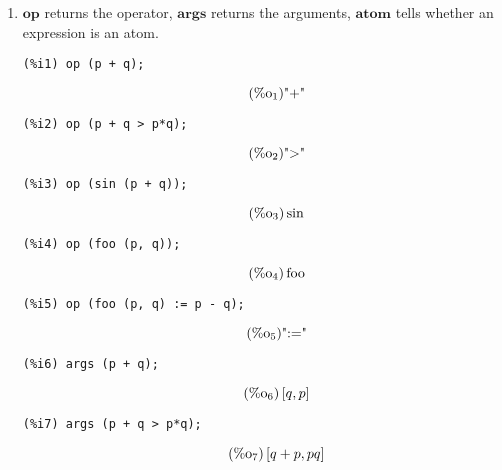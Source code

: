 \documentclass[12pt,leqno]{article}
\begin{document}
\begin{enumerate}
\item $\mathbf{op}$ returns the operator, $\mathbf{args}$ returns the arguments,
$\mathbf{atom}$ tells whether an expression is an atom.
\begin{verbatim}
(%i1) op (p + q);
\end{verbatim}
\begin{equation}
\tag{$\mathop{\mathrm{\%o}_{1}}$}\mbox{"+"}
\label{eq:doc-group1-code10-1-1}
\end{equation}
\begin{verbatim}
(%i2) op (p + q > p*q);
\end{verbatim}
\begin{equation}
\tag{$\mathop{\mathrm{\%o}_{2}}$}\mbox{"\textgreater "}
\label{eq:doc-group1-code10-2-1}
\end{equation}
\begin{verbatim}
(%i3) op (sin (p + q));
\end{verbatim}
\begin{equation}
\tag{$\mathop{\mathrm{\%o}_{3}}$}\sin
\label{eq:doc-group1-code10-3-1}
\end{equation}
\begin{verbatim}
(%i4) op (foo (p, q));
\end{verbatim}
\begin{equation}
\tag{$\mathop{\mathrm{\%o}_{4}}$}\mathop{\mathrm{foo}}
\label{eq:doc-group1-code10-4-1}
\end{equation}
\begin{verbatim}
(%i5) op (foo (p, q) := p - q);
\end{verbatim}
\begin{equation}
\tag{$\mathop{\mathrm{\%o}_{5}}$}\mbox{":="}
\label{eq:doc-group1-code10-5-1}
\end{equation}
\begin{verbatim}
(%i6) args (p + q);
\end{verbatim}
\begin{equation}
\tag{$\mathop{\mathrm{\%o}_{6}}$}\left[q, p\right]
\label{eq:doc-group1-code10-6-1}
\end{equation}
\begin{verbatim}
(%i7) args (p + q > p*q);
\end{verbatim}
\begin{equation}
\tag{$\mathop{\mathrm{\%o}_{7}}$}\left[q+p, p q\right]
\label{eq:doc-group1-code10-7-1}
\end{equation}

\end{enumerate}
\end{document}
